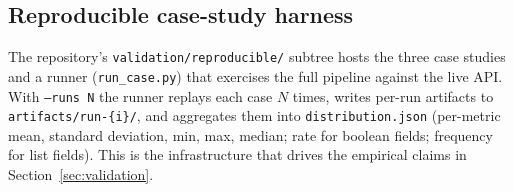 \subsection{Reproducible case-study harness}

The repository's \texttt{validation/reproducible/} subtree hosts the
three case studies and a runner (\texttt{run\_case.py}) that exercises
the full pipeline against the live API. With \texttt{--runs N} the
runner replays each case $N$ times, writes per-run artifacts to
\texttt{artifacts/run-\{i\}/}, and aggregates them into
\texttt{distribution.json} (per-metric mean, standard deviation, min,
max, median; rate for boolean fields; frequency for list fields).
This is the infrastructure that drives the empirical claims in
Section~\ref{sec:validation}.


